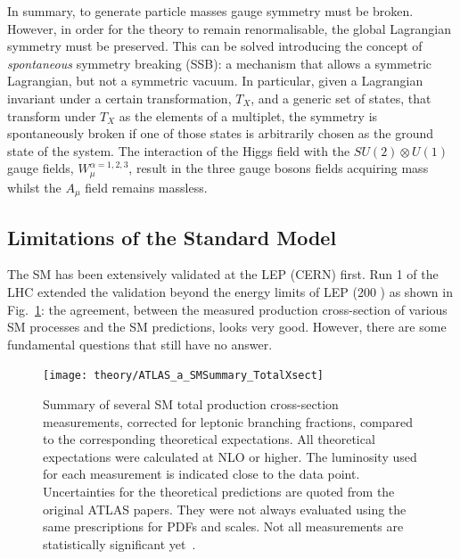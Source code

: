 			In summary, to generate particle masses gauge symmetry must be broken. However, in order for the theory to remain renormalisable, the global Lagrangian symmetry must be preserved. This can be solved introducing the concept of \emph{spontaneous} symmetry breaking (SSB): a mechanism that allows a symmetric Lagrangian, but not a symmetric vacuum. In particular, given a Lagrangian invariant under a certain transformation, $T_X$, and a generic set of states, that transform under $T_X$ as the elements of a multiplet, the symmetry is spontaneously broken if one of those states is arbitrarily chosen as the ground state of the system. 
			The interaction of the Higgs field with the $SU(2) \otimes U(1)$ gauge fields, $W_\mu^{\alpha =1,2,3}$, result in the three gauge bosons fields acquiring mass whilst the $A_\mu$ field remains massless. 



		\subsection{Limitations of the Standard Model}
		\label{sec:SMlim}

			The \ac{SM} has been extensively validated at the \ac{LEP} (\ac{CERN}) first. Run 1 of the \ac{LHC} extended the validation beyond the energy limits of LEP (200 \GeV) as shown in Fig.~\ref{fig:ATLAS_a_SMSummary_TotalXsect}: the agreement, between the measured production cross-section of various \ac{SM} processes and the \ac{SM} predictions, looks very good. However, there are some fundamental questions that still have no answer.

			\begin{figure}[!htb]
				\centering
				\texttt{[image: theory/ATLAS\_a\_SMSummary\_TotalXsect]}
				\caption{\label{fig:ATLAS_a_SMSummary_TotalXsect} Summary of several \ac{SM} total production cross-section measurements, corrected for leptonic branching fractions, compared to the corresponding theoretical expectations. All theoretical expectations were calculated at NLO or higher. The luminosity used for each measurement is indicated close to the data point. Uncertainties for the theoretical predictions are quoted from the original ATLAS papers. They were not always evaluated using the same prescriptions for PDFs and scales. Not all measurements are statistically significant yet~\cite{ATLAS_a_SMSummary_TotalXsect}.}
			\end{figure}




